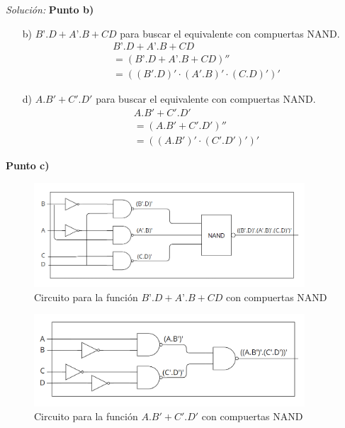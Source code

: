 \documentclass{article}
\newenvironment{solution}
    {\textit{Solución:}}
    {}
\begin{document}
\begin{solution}
\textbf{Punto b)}\\
\begin{itemize}
    \item[b)] $B’.D + A’.B + CD$ para buscar el equivalente con compuertas NAND.\\
    \begin{align*}
        & B’.D + A’.B + CD \\
        &= (B’.D + A’.B + CD)'' \\
        &= ((B'.D)' \cdot (A'.B)' \cdot (C.D)')'
    \end{align*} 
    \item[d)] $A.B' + C'.D'$ para buscar el equivalente con compuertas NAND.\\
    \begin{align*}
        & A.B' + C'.D' \\
        &= (A.B' + C'.D')'' \\
        &= ((A.B')' \cdot (C'.D')')'
    \end{align*}
\end{itemize}

\textbf{Punto c)}\\
\begin{figure}[h]
    \centering
    \includegraphics[width=0.9\textwidth]{tp02fig3.png}
    \caption{Circuito para la función $B’.D + A’.B + CD$ con compuertas NAND}
\end{figure}

\newpage
\begin{figure}[h]
    \centering
    \includegraphics[width=0.9\textwidth]{tp02fig4.png}
    \caption{Circuito para la función $A.B' + C'.D'$ con compuertas NAND}
\end{figure}
\end{solution}
\end{document}
